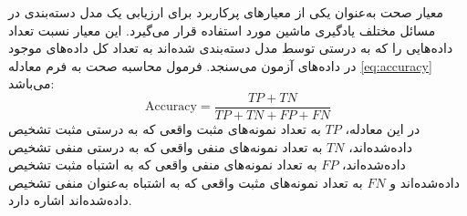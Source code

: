 معیار صحت به‌عنوان یکی از معیارهای پرکاربرد برای ارزیابی یک مدل دسته‌بندی در مسائل مختلف یادگیری ماشین مورد استفاده قرار می‌گیرد. این معیار نسبت تعداد داده‌هایی را که به درستی توسط مدل دسته‌بندی شده‌اند به تعداد کل داده‌های موجود در داده‌های آزمون می‌سنجد. فرمول محاسبه صحت به فرم معادله \ref{eq:accuracy} می‌باشد:
\begin{equation}
    \mathrm{Accuracy}=\frac{TP+TN}{TP+TN+FP+FN}
    \label{eq:accuracy}
\end{equation}
در این معادله، $TP$ به تعداد نمونه‌های مثبت واقعی که به درستی مثبت تشخیص داده‌شده‌اند، $TN$ به تعداد نمونه‌های منفی واقعی که به درستی منفی تشخیص داده‌شده‌اند، $FP$ به تعداد نمونه‌های منفی واقعی که به اشتباه مثبت تشخیص داده‌شده‌اند و $FN$ به تعداد نمونه‌های مثبت واقعی که به اشتباه به‌عنوان منفی تشخیص داده‌شده‌اند اشاره دارد.

